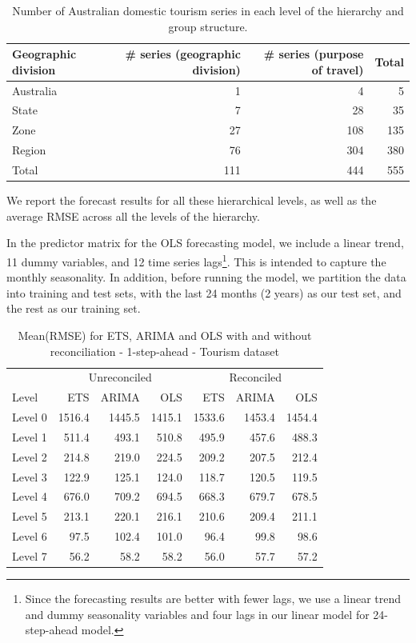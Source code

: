 \documentclass[11pt,a4paper,]{article}
\begin{document}
\begin{table}[!h]

\caption{\label{tab:Australiageographicalpurposedivision}Number of Australian domestic tourism series in each level of the hierarchy and group structure.}
\centering
\begin{tabular}{lrrr}
\toprule
Geographic division & \# series (geographic division) & \# series (purpose of travel) & Total\\
\midrule
Australia & 1 & 4 & 5\\
State & 7 & 28 & 35\\
Zone & 27 & 108 & 135\\
Region & 76 & 304 & 380\\
Total & 111 & 444 & 555\\
\bottomrule
\end{tabular}
\end{table}

We report the forecast results for all these hierarchical levels, as well as the average RMSE across all the levels of the hierarchy.

In the predictor matrix for the OLS forecasting model, we include a linear trend, 11 dummy variables, and 12 time series lags\footnote{Since the forecasting results are better with fewer lags, we use a linear trend and dummy seasonality variables and four lags in our linear model for 24-step-ahead model.}. This is intended to capture the monthly seasonality. In addition, before running the model, we partition the data into training and test sets, with the last 24 months (2 years) as our test set, and the rest as our training set.


\begin{table}[!h]

\caption{\label{tab:Tourismdataresulrolling}Mean(RMSE) for ETS, ARIMA and OLS with and without reconciliation - 1-step-ahead - Tourism dataset}
\centering
\begin{tabular}{lrrrrrr}
\toprule
\multicolumn{1}{c}{} & \multicolumn{3}{c}{Unreconciled} & \multicolumn{3}{c}{Reconciled} \\
\cmidrule(l{3pt}r{3pt}){2-4} \cmidrule(l{3pt}r{3pt}){5-7}
Level & ETS & ARIMA & OLS & ETS & ARIMA & OLS\\
\midrule
Level 0 & 1516.4 & 1445.5 & 1415.1 & 1533.6 & 1453.4 & 1454.4\\
Level 1 & 511.4 & 493.1 & 510.8 & 495.9 & 457.6 & 488.3\\
Level 2 & 214.8 & 219.0 & 224.5 & 209.2 & 207.5 & 212.4\\
Level 3 & 122.9 & 125.1 & 124.0 & 118.7 & 120.5 & 119.5\\
Level 4 & 676.0 & 709.2 & 694.5 & 668.3 & 679.7 & 678.5\\
Level 5 & 213.1 & 220.1 & 216.1 & 210.6 & 209.4 & 211.1\\
Level 6 & 97.5 & 102.4 & 101.0 & 96.4 & 99.8 & 98.6\\
Level 7 & 56.2 & 58.2 & 58.2 & 56.0 & 57.7 & 57.2\\
\bottomrule
\end{tabular}
\end{table}
\end{document}
